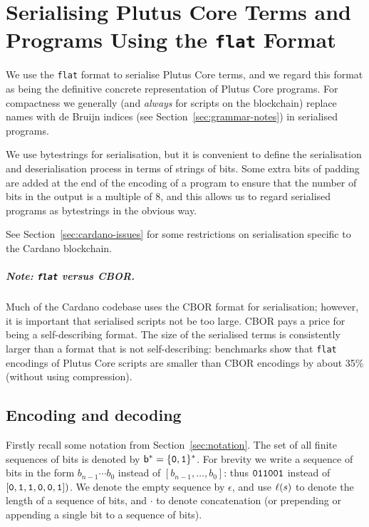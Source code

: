 \chapter{Serialising Plutus Core Terms and Programs Using the \texttt{flat} Format}
\label{appendix:flat-serialisation}
We use the \texttt{flat} format \cite{flat} to serialise Plutus Core
terms, and we regard this format as being the definitive concrete representation
of Plutus Core programs. For compactness we generally (and \textit{always} for
scripts on the blockchain) replace names with de Bruijn indices (see
Section~\ref{sec:grammar-notes}) in serialised programs.

We use bytestrings for serialisation, but it is convenient to define the
serialisation and deserialisation process in terms of strings of bits. Some
extra bits of padding are added at the end of the encoding of a program to
ensure that the number of bits in the output is a multiple of 8, and this allows
us to regard serialised programs as bytestrings in the obvious way.

See Section~\ref{sec:cardano-issues} for some restrictions on serialisation
specific to the Cardano blockchain.

\paragraph{Note: \texttt{flat} versus CBOR.}
Much of the Cardano codebase uses the CBOR format for serialisation; however, it
is important that serialised scripts not be too large. CBOR pays a price for
being a self-describing format. The size of the serialised terms is consistently
larger than a format that is not self-describing: benchmarks show that
\texttt{flat} encodings of Plutus Core scripts are smaller than CBOR encodings
by about 35\% (without using compression).



\section{Encoding and decoding}
\label{sec:encoding-and-decoding}
Firstly recall some notation from Section~\ref{sec:notation}.  The set of all
finite sequences of bits is denoted by $\mathsf{b}^* = \{\mathtt{0},\mathtt{1}\}^*$.  For
brevity we write a sequence of bits in the form $b_{n-1} \cdots b_0$ instead of
$[b_{n-1}, \ldots, b_0]$: thus $\mathtt{011001}$ instead of $[\mathtt{0},
  \mathtt{1},\mathtt{1},\mathtt{0},\mathtt{0},\mathtt{1}])$.  We denote the empty sequence
by $\epsilon$, and use $\operatorname{\ell}(s)$ to denote the length of a sequence of bits,
and $\cdot$ to denote concatenation (or prepending or appending a single bit to
a sequence of bits).%

